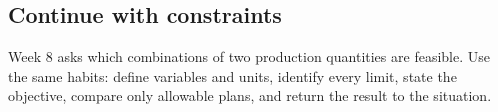 \documentclass[11pt,letterpaper]{article}
\begin{document}
{\subsection*{Continue with constraints}
Week 8 asks which combinations of two production quantities are feasible. Use the same habits: define variables and units, identify every limit, state the objective, compare only allowable plans, and return the result to the situation.
}
\end{document}
